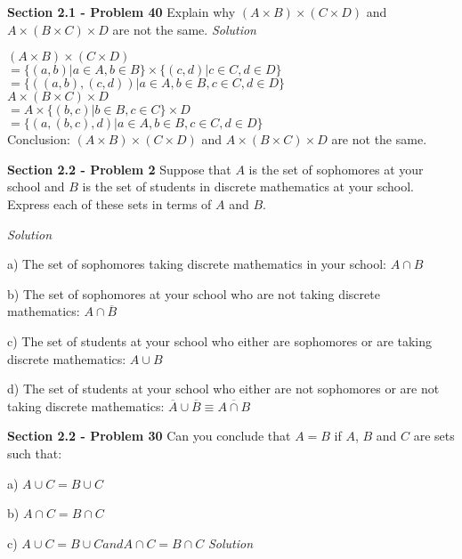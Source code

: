 \documentclass[10pt]{article}
\begin{document}
\clearpage
\textbf{Section 2.1 - Problem 40} Explain why $(A \times B) \times (C \times D)$ and
$A \times (B \times C) \times D$ are not the same.
\bigbreak
\textit{Solution} 
\bigbreak

    $(A \times B) \times (C \times D)$ \\
    $= \{(a, b) | a \in A, b \in B\} \times \{(c, d) | c \in C, d \in D\} $ \\
    $= \{((a, b), (c, d)) | a \in A, b \in B, c \in C, d \in D\}$ \\
    \break
    $A \times (B \times C) \times D$ \\
    $= A \times \{(b, c) | b \in B, c \in C\} \times D$ \\
    $= \{(a, (b, c), d) | a \in A, b \in B, c \in C, d \in D\}$ \\
    \break
    Conclusion: $(A \times B) \times (C \times D)$ and $A \times (B \times C) \times D$
    are not the same.


\clearpage
\textbf{Section 2.2 - Problem 2} Suppose that $A$ is the set of sophomores at your school
and $B$ is the set of students in discrete mathematics at your school. Express each of these
sets in terms of $A$ and $B$.

\bigbreak
\textit{Solution} 
\bigbreak

    \par a) The set of sophomores taking discrete mathematics in your school: $A \cap B$
    \par b) The set of sophomores at your school who are not taking discrete mathematics:
    $A \cap \overline{B}$
    \par c) The set of students at your school who either are sophomores or are taking
    discrete mathematics: $A \cup B$
    \par d) The set of students at your school who either are not sophomores or are not
    taking discrete mathematics: $\overline{A} \cup \overline{B} \equiv \overline{A \cap B}$

\clearpage
\textbf{Section 2.2 - Problem 30} Can you conclude that $A = B$ if $A$, $B$ and $C$ are sets
such that:
\par a) $A \cup C = B \cup C$
\par b) $A \cap C = B \cap C$
\par c) $A \cup C = B \cup C and A \cap C = B \cap C$
\bigbreak
\textit{Solution} 
\bigbreak
\end{document}
